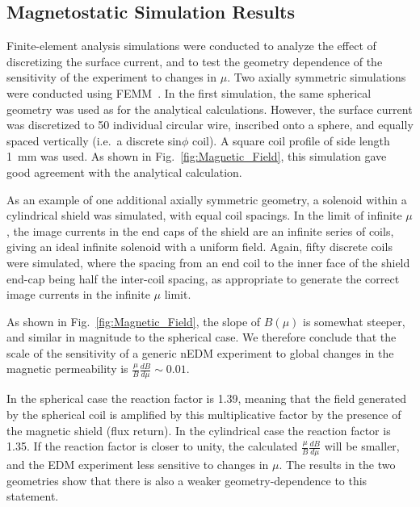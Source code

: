 \documentclass[review]{elsarticle}
\begin{document}
\subsection{Magnetostatic Simulation Results \label{sec:femm}}

Finite-element analysis simulations were conducted to analyze the
effect of discretizing the surface current, and to test the geometry
dependence of the sensitivity of the experiment to changes in $\mu$.
Two axially symmetric simulations were conducted using
FEMM~\cite{bib:femm}.  In the first simulation, the same spherical geometry was
used as for the analytical calculations.  However, the surface current
was discretized to 50 individual circular wire, inscribed onto a
sphere, and equally spaced vertically (i.e.~a discrete sin$\phi$
coil).  A square coil profile of side length 1~mm was used.  As shown
in Fig.~\ref{fig:Magnetic_Field}, this simulation gave good agreement
with the analytical calculation.

As an example of one additional axially symmetric geometry, a solenoid
within a cylindrical shield was simulated, with equal coil spacings.
In the limit of infinite $\mu$, the image currents in the end caps of
the shield are an infinite series of coils, giving an ideal infinite
solenoid with a uniform field.  Again, fifty discrete coils were
simulated, where the spacing from an end coil to the inner face of the
shield end-cap being half the inter-coil spacing, as appropriate to
generate the correct image currents in the infinite $\mu$ limit. 

As shown in Fig.~\ref{fig:Magnetic_Field}, the slope of $B(\mu)$ is
somewhat steeper, and similar in magnitude to the spherical case.  We
therefore conclude that the scale of the sensitivity of a generic nEDM
experiment to global changes in the magnetic permeability is
$\frac{\mu}{B}\frac{dB}{d\mu}\sim 0.01$.

In the spherical case the reaction factor is 1.39, meaning that the
field generated by the spherical coil is amplified by this
multiplicative factor by the presence of the magnetic shield (flux
return).  In the cylindrical case the reaction factor is 1.35.  If the
reaction factor is closer to unity, the calculated
$\frac{\mu}{B}\frac{dB}{d\mu}$ will be smaller, and the EDM experiment
less sensitive to changes in $\mu$.  The results in the two geometries
show that there is also a weaker geometry-dependence to this
statement.


\end{document}

